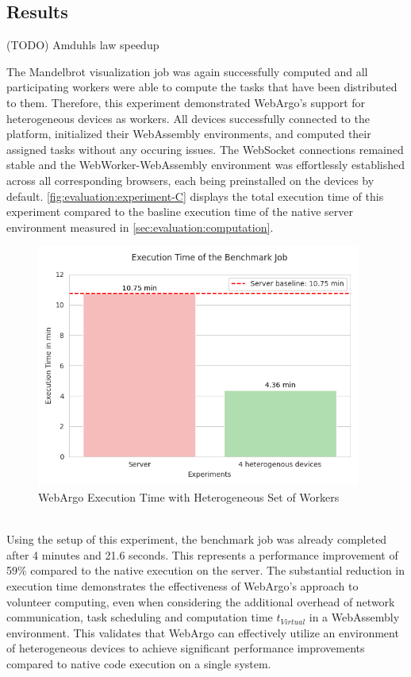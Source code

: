 \subsection{Results}
(TODO) Amduhls law speedup

The Mandelbrot visualization job was again successfully computed and all participating workers were able to compute the tasks that have been distributed to them. Therefore, this experiment demonstrated WebArgo's support for heterogeneous devices as workers. All devices successfully connected to the platform, initialized their WebAssembly environments, and computed their assigned tasks without any occuring issues. The WebSocket connections remained stable and the WebWorker-WebAssembly environment was effortlessly established across all corresponding browsers, each being preinstalled on the devices by default. \autoref{fig:evaluation:experiment-C} displays the total execution time of this experiment compared to the basline execution time of the native server environment measured in \autoref{sec:evaluation:computation}.
\begin{figure}[htbp]
    \centering
    \includegraphics[width=0.95\textwidth]{gfx/figures/Evaluation_C.png}
    \caption{WebArgo Execution Time with Heterogeneous Set of Workers}
    \label{fig:evaluation:experiment-C}
\end{figure}
~\\
Using the setup of this experiment, the benchmark job was already completed after 4 minutes and 21.6 seconds. This represents a performance improvement of 59\% compared to the native execution on the server. The substantial reduction in execution time demonstrates the effectiveness of WebArgo's approach to volunteer computing, even when considering the additional overhead of network communication, task scheduling and computation time $t_{Virtual}$ in a WebAssembly environment. This validates that WebArgo can effectively utilize an environment of heterogeneous devices to achieve significant performance improvements compared to native code execution on a  single system.
